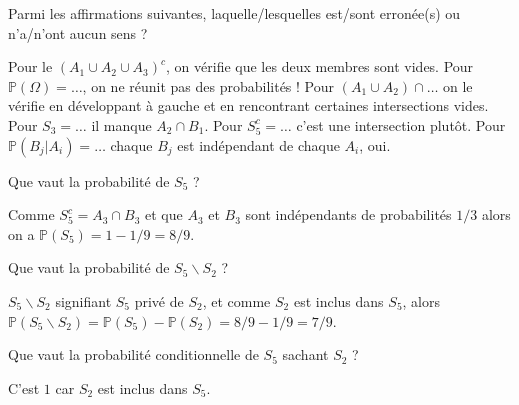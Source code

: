 \begin{question}
Parmi les affirmations suivantes, laquelle/lesquelles est/sont erronée(s) ou n'a/n'ont aucun sens ?
\begin{answers}
\end{answers}
\begin{explanations}
Pour le $(A_1\cup A_2\cup A_3)^c$,  on vérifie que les deux membres sont vides. Pour $\mathbb{P}(\Omega)=\ldots$, on ne réunit pas des probabilités ! Pour $(A_1\cup A_2)\cap\ldots$ on le vérifie en développant à gauche et en rencontrant certaines intersections vides.   Pour $S_3=\ldots$ il manque $A_2\cap B_1$. Pour $S^c_5=\ldots$ c'est une intersection plutôt. Pour $\mathbb{P}(B_j|A_i)=\ldots$ chaque $B_j$ est indépendant de chaque $A_i$, oui. 
\end{explanations}
\end{question}


\begin{question}
Que vaut la probabilité de $S_5$ ?
\begin{answers}
\end{answers}
\begin{explanations}
Comme $S_5^c = A_3 \cap B_3$ et que $A_3$ et $B_3$ sont indépendants de probabilités $1/3$ alors 
on a $\mathbb{P}(S_5) = 1-1/9 = 8/9$.
\end{explanations}
\end{question}


\begin{question}
Que vaut la probabilité de $S_5\backslash S_2$ ?
\begin{answers}
\end{answers}
\begin{explanations}
$S_5\backslash S_2$ signifiant $S_5$ privé de $S_2$, et comme $S_2$ est inclus dans $S_5$, alors 
$\mathbb{P}(S_5\backslash S_2) = \mathbb{P}(S_5) - \mathbb{P}(S_2)
= 8/9-1/9 = 7/9$.
\end{explanations}
\end{question}


\begin{question}
Que vaut la probabilité conditionnelle de $S_5$ sachant $S_2$ ?
\begin{answers}
\end{answers}
\begin{explanations}
C'est $1$ car $S_2$ est inclus dans $S_5$.
\end{explanations}
\end{question}



